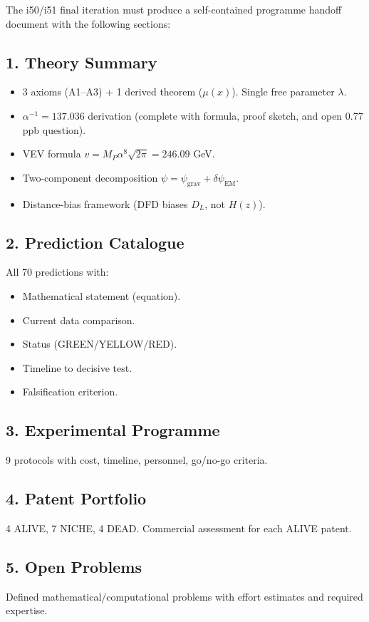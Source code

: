 \documentclass[11pt,a4paper]{article}
\begin{document}
The i50/i51 final iteration must produce a self-contained programme handoff document with the following sections:

\subsection{1. Theory Summary}
\begin{itemize}
\item 3 axioms (A1--A3) + 1 derived theorem ($\mu(x)$). Single free parameter $\lambda$.
\item $\alpha^{-1} = 137.036$ derivation (complete with formula, proof sketch, and open 0.77 ppb question).
\item VEV formula $v = M_P \alpha^8 \sqrt{2\pi} = 246.09$ GeV.
\item Two-component decomposition $\psi = \psi_{\text{grav}} + \delta\psi_{\text{EM}}$.
\item Distance-bias framework (DFD biases $D_L$, not $H(z)$).
\end{itemize}

\subsection{2. Prediction Catalogue}
All 70 predictions with:
\begin{itemize}
\item Mathematical statement (equation).
\item Current data comparison.
\item Status (GREEN/YELLOW/RED).
\item Timeline to decisive test.
\item Falsification criterion.
\end{itemize}

\subsection{3. Experimental Programme}
9 protocols with cost, timeline, personnel, go/no-go criteria.

\subsection{4. Patent Portfolio}
4 ALIVE, 7 NICHE, 4 DEAD. Commercial assessment for each ALIVE patent.

\subsection{5. Open Problems}
Defined mathematical/computational problems with effort estimates and required expertise.
\end{document}
